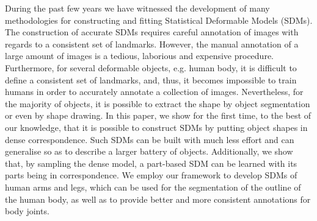 
During the past few years we have witnessed the development of many methodologies for constructing and fitting Statistical Deformable Models (SDMs). The construction of accurate SDMs requires careful annotation of images with regards to a consistent set of landmarks. However, the manual annotation of a large amount of images is a tedious, laborious and expensive procedure. Furthermore, for several deformable objects, e.g. human body, it is difficult to define a consistent set of landmarks, and, thus, it becomes impossible to train humans in order to accurately annotate a collection of images. Nevertheless, for the majority of objects, it is possible to extract the shape by object segmentation or even by shape drawing. In this paper, we show for the first time, to the best of our knowledge, that it is possible to construct SDMs by putting object shapes in dense correspondence. Such SDMs can be built with much less effort and can generalise so as to describe a larger battery of objects. Additionally, we show that, by sampling the dense model, a part-based SDM can be learned with its parts being in correspondence. We employ our framework to develop SDMs of human arms and legs, which can be used for the segmentation of the outline of the human body, as well as to provide better and more consistent annotations for body joints.